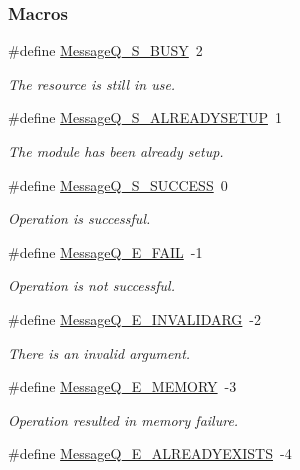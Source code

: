 \subsubsection*{Macros}
\begin{DoxyCompactItemize}
\item 
\#define \hyperlink{_message_q_8h_aaccc1e5cf87160e123d1eee033d2ad75}{Message\-Q\-\_\-\-S\-\_\-\-B\-U\-S\-Y}~2
\begin{DoxyCompactList}\small\item\em The resource is still in use. \end{DoxyCompactList}\item 
\#define \hyperlink{_message_q_8h_ae4bc8b4de93c57b77110dc473b16108f}{Message\-Q\-\_\-\-S\-\_\-\-A\-L\-R\-E\-A\-D\-Y\-S\-E\-T\-U\-P}~1
\begin{DoxyCompactList}\small\item\em The module has been already setup. \end{DoxyCompactList}\item 
\#define \hyperlink{_message_q_8h_a1643901e74764002f880ccc408691de6}{Message\-Q\-\_\-\-S\-\_\-\-S\-U\-C\-C\-E\-S\-S}~0
\begin{DoxyCompactList}\small\item\em Operation is successful. \end{DoxyCompactList}\item 
\#define \hyperlink{_message_q_8h_a19b5749722c26050d2e56c2104f982fe}{Message\-Q\-\_\-\-E\-\_\-\-F\-A\-I\-L}~-\/1
\begin{DoxyCompactList}\small\item\em Operation is not successful. \end{DoxyCompactList}\item 
\#define \hyperlink{_message_q_8h_a1855a3c9b16a1fff0e24b82beaa3dd58}{Message\-Q\-\_\-\-E\-\_\-\-I\-N\-V\-A\-L\-I\-D\-A\-R\-G}~-\/2
\begin{DoxyCompactList}\small\item\em There is an invalid argument. \end{DoxyCompactList}\item 
\#define \hyperlink{_message_q_8h_a1205c1ab4a71a4850d836ff6aa6bbfeb}{Message\-Q\-\_\-\-E\-\_\-\-M\-E\-M\-O\-R\-Y}~-\/3
\begin{DoxyCompactList}\small\item\em Operation resulted in memory failure. \end{DoxyCompactList}\item 
\#define \hyperlink{_message_q_8h_ad8d156d79a68fada5951aef246dcda0d}{Message\-Q\-\_\-\-E\-\_\-\-A\-L\-R\-E\-A\-D\-Y\-E\-X\-I\-S\-T\-S}~-\/4

\end{DoxyCompactItemize}
